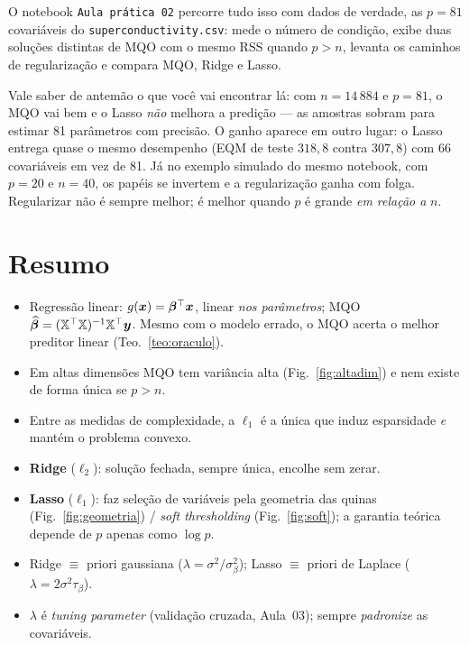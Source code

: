 \documentclass[11pt,a4paper]{article}
\begin{document}
O notebook \texttt{Aula prática 02} percorre tudo isso com dados de verdade, as $p=81$
covariáveis do \texttt{superconductivity.csv}: mede o número de condição, exibe duas
soluções distintas de MQO com o mesmo RSS quando $p>n$, levanta os caminhos de
regularização e compara MQO, Ridge e Lasso.

\begin{observacao}
Vale saber de antemão o que você vai encontrar lá: com $n=14\,884$ e $p=81$, o MQO
vai bem e o Lasso \emph{não} melhora a predição --- as amostras sobram para estimar
81 parâmetros com precisão. O ganho aparece em outro lugar: o Lasso entrega quase o
mesmo desempenho (EQM de teste $318{,}8$ contra $307{,}8$) com 66 covariáveis em vez
de 81. Já no exemplo simulado do mesmo notebook, com $p=20$ e $n=40$, os papéis se
invertem e a regularização ganha com folga. Regularizar não é sempre melhor; é melhor
quando $p$ é grande \emph{em relação a} $n$.
\end{observacao}

\section*{Resumo}
\begin{itemize}[leftmargin=1.4cm]
  \item Regressão linear: $g(\bm{x})=\bm{\beta}^\top\bm{x}$, linear \emph{nos parâmetros};
        MQO $\widehat{\bm{\beta}}=(\mathbb{X}^\top\mathbb{X})^{-1}\mathbb{X}^\top\bm{y}$. Mesmo com
        o modelo errado, o MQO acerta o melhor preditor linear
        (Teo.~\ref{teo:oraculo}).
  \item Em altas dimensões MQO tem variância alta (Fig.~\ref{fig:altadim}) e nem
        existe de forma única se $p>n$.
  \item Entre as medidas de complexidade, a $\ell_1$ é a única que induz esparsidade
        \emph{e} mantém o problema convexo.
  \item \textbf{Ridge} ($\ell_2$): solução fechada, sempre única, encolhe sem
        zerar.
  \item \textbf{Lasso} ($\ell_1$): faz seleção de variáveis pela geometria das
        quinas (Fig.~\ref{fig:geometria}) / \emph{soft thresholding}
        (Fig.~\ref{fig:soft}); a garantia teórica depende de $p$ apenas como
        $\log p$.
  \item Ridge $\equiv$ priori gaussiana ($\lambda=\sigma^2/\sigma_\beta^2$);
        Lasso $\equiv$ priori de Laplace ($\lambda=2\sigma^2\tau_\beta$).
  \item $\lambda$ é \emph{tuning parameter} (validação cruzada, Aula~03); sempre
        \emph{padronize} as covariáveis.
\end{itemize}
\end{document}
